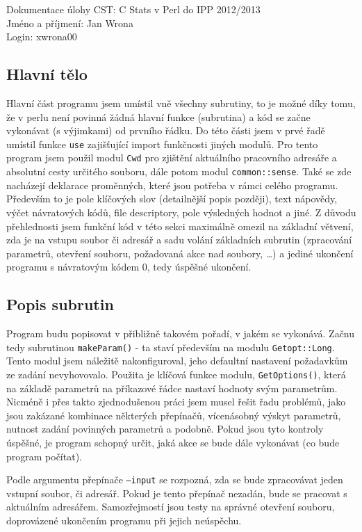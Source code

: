 \documentclass[a4paper, 10pt]{article}[12.03.2013]
\begin{document}
\noindent
Dokumentace úlohy CST: C Stats v Perl do IPP 2012/2013\\
Jméno a příjmení: Jan Wrona\\
Login: xwrona00

\subsection*{Hlavní tělo}
Hlavní část programu jsem umístil vně všechny subrutiny, to je možné díky tomu,
že v perlu není povinná žádná hlavní funkce (subrutina) a kód se začne vykonávat
(s výjimkami) od prvního řádku. Do této části jsem v prvé řadě umístil funkce
\texttt{use} zajišťující import funkčnosti jiných modulů. Pro tento program jsem
použil modul \texttt{Cwd} pro zjištění aktuálního pracovního adresáře a absolutní
cesty určitého souboru, dále potom modul \texttt{common::sense}.
Také se zde nacházejí deklarace proměnných, které jsou potřeba v rámci celého programu.
Především to je pole klíčových slov (detailnější popis později), text nápovědy, výčet
návratových kódů, file descriptory, pole výsledných hodnot a jiné. Z důvodu přehlednosti
jsem funkční kód v této sekci maximálně omezil na základní větvení, zda je na vstupu
soubor či adresář a sadu volání základních subrutin (zpracování parametrů, otevření
souboru, požadovaná akce nad soubory, \dots) a jediné ukončení programu s návratovým kódem 0, 
tedy úspěšné ukončení.

\subsection*{Popis subrutin}
Program budu popisovat v přibližně takovém pořadí, v jakém se vykonává. Začnu tedy
subrutinou \texttt{makeParam()} - ta staví především na modulu \texttt{Getopt::Long}.
Tento modul jsem náležitě nakonfiguroval, jeho defaultní nastavení požadavkům ze
zadání nevyhovovalo. Použita je klíčová funkce modulu, \texttt{GetOptions()}, která
na základě parametrů na příkazové řádce nastaví hodnoty svým parametrům. Nicméně
i přes takto zjednodušenou práci jsem musel řešit řadu problémů, jako jsou zakázané
kombinace některých přepínačů, vícenásobný výskyt parametrů, nutnost zadání
povinných parametrů a podobně. Pokud jsou tyto kontroly úspěšné, je program schopný
určit, jaká akce se bude dále vykonávat (co bude program počítat).

Podle argumentu přepínače \texttt{---input} se rozpozná, zda se bude zpracovávat
jeden vstupní soubor, či adresář. Pokud je tento přepínač nezadán, bude se pracovat
s aktuálním adresářem. Samozřejmostí jsou testy na správné otevření souboru, doprovázené
ukončením programu při jejich neúspěchu.
\end{document}
